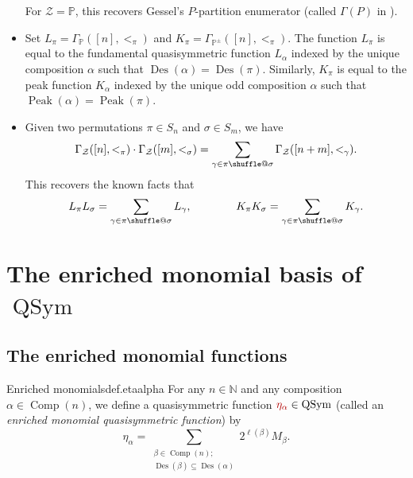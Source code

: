 \documentclass[numbers=enddot,12pt,final,onecolumn,notitlepage]{scrartcl}%
\makeatletter
\newcommand{\al}{\alpha}
\newcommand{\NN}{\mathbb{N}} %
\newcommand{\PP}{\mathbb{P}} %
\newcommand{\QSym}{\operatorname{QSym}}
\newcommand{\Des}{\operatorname{Des}}
\newcommand{\Comp}{\operatorname{Comp}}
\newcommand{\Peak}{\operatorname{Peak}}
\providecommand*{\shuffle}{%
  \mathbin{\mathpalette\shuffle@{}}%
}
\newcommand*{\shuffle@}[2]{%
  \sbox0{$#1\vcenter{}$}%
  \kern .15\ht0 %
  \rlap{\vrule height .25\ht0 depth 0pt width 2.5\ht0}%
  \raise.1\ht0\hbox to 2.5\ht0{%
    \vrule height 1.75\ht0 depth -.1\ht0 width .17\ht0 %
    \hfill
    \vrule height 1.75\ht0 depth -.1\ht0 width .17\ht0 %
    \hfill
    \vrule height 1.75\ht0 depth -.1\ht0 width .17\ht0 %
  }%
  \kern .15\ht0 %
}
\newcommand{\defn}[1]{{\color{darkred}\emph{#1}}}
\newcommand{\defnm}[1]{{\color{darkred} #1}}
\newcommand{\0}{\phantom{c}}
\let\sumnonlimits\sum
\renewcommand{\sum}{\sumnonlimits\limits}
\makeatother
\begin{document}
\begin{itemize}
For $\mathcal{Z} = \PP$, this recovers Gessel's $P$-partition enumerator (called $\Gamma(P)$ in \cite{Ges84}).

\item Set $L_{\pi}= \Gamma_{\PP}([n],<_\pi)$ and $K_{\pi}= \Gamma_{\PP^\pm}([n],<_\pi)$. The function $L_\pi$ is equal to the fundamental quasisymmetric function $L_\al$ indexed by the unique composition $\al$ such that $\Des(\al) = \Des(\pi)$. Similarly, $K_\pi$ is equal to the peak function $K_\al$ indexed by the unique odd composition $\al$ such that $\Peak(\al) = \Peak(\pi)$. 

\item Given two permutations $\pi \in S_n$ and $\sigma \in S_m$, we have
\begin{equation}
\label{eq : GGG}
\Gamma_{\mathcal{Z}}([n],<_\pi)
\cdot \Gamma_{\mathcal{Z}}([m],<_\sigma)
= \sum_{\gamma \in \pi \shuffle \sigma}\Gamma_{\mathcal{Z}}([n+m],<_\gamma) .
\end{equation}
This recovers the known facts that
\[
L_{\pi}L_{\sigma} = \sum_{\gamma \in \pi \shuffle \sigma}L_{\gamma}, \qquad\qquad
K_{\pi}K_{\sigma} = \sum_{\gamma \in \pi \shuffle \sigma}K_{\gamma}.
\]
\end{itemize}
\section{The enriched monomial basis of $\QSym$}
\subsection{The enriched monomial functions}

\begin{definition}{Enriched monomials}{def.etaalpha}
For any $n\in\NN$ and any composition $\alpha
\in \Comp(n)$, we define a quasisymmetric function
$\defnm{\eta_{\alpha}}\in\QSym$ (called an
\defn{enriched monomial quasisymmetric function}) by
\begin{equation}
\eta_{\alpha}=\sum_{\substack{\beta\in \Comp(n);\\
\Des\left(  \beta\right)  \subseteq \Des\left(  \alpha\right)  }}2^{\ell\left(
\beta\right)  }M_{\beta}. \label{eq.def.etaalpha.def}%
\end{equation}

\end{definition}
\end{document}
